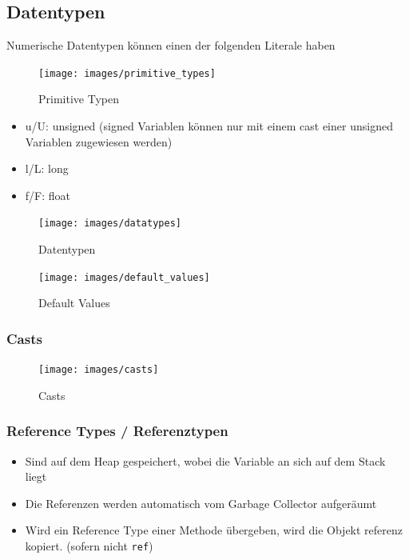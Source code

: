 \clearpage

\subsection{Datentypen}
Numerische Datentypen können einen der folgenden Literale haben
\begin{figure}[h!]
\centering
\texttt{[image: images/primitive\_types]}
\caption{Primitive Typen}
\label{fig:primitivetypes}
\end{figure}

\begin{itemize}
	\item u/U: unsigned (signed Variablen können nur mit einem cast einer unsigned Variablen zugewiesen werden)
	\item l/L: long
	\item f/F: float
\end{itemize}
\begin{figure}[h!]
\centering
\texttt{[image: images/datatypes]}
\caption{Datentypen}
\label{fig:datatypes}
\end{figure}

\begin{figure}[h!]
\centering
\texttt{[image: images/default\_values]}
\caption{Default Values}
\label{fig:defaultvalues}
\end{figure}

\newpage

\subsubsection{Casts}
\begin{figure}[h!]
\centering
\texttt{[image: images/casts]}
\caption{Casts}
\label{fig:casts}
\end{figure}

\clearpage

\subsubsection{Reference Types / Referenztypen}
\begin{itemize}
	\item Sind auf dem Heap gespeichert, wobei die Variable an sich auf dem Stack liegt
	\item Die Referenzen werden automatisch vom Garbage Collector aufgeräumt
	\item Wird ein Reference Type einer Methode übergeben, wird die Objekt referenz kopiert. (sofern nicht \lstinline|ref|)
\end{itemize}

